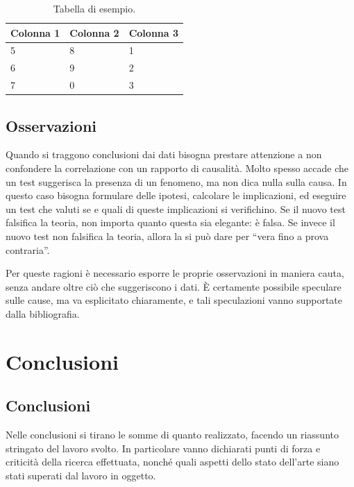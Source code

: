 \documentclass[12pt,italian]{report}
\begin{document}
\begin{table}
	\centering
    \begin{tabular}{|l|l|l|}
	\hline
	Colonna 1 & Colonna 2 & Colonna 3 \\ \hline
	5         & 8         & 1         \\
	6         & 9         & 2         \\
	7         & 0         & 3         \\ \hline
\end{tabular}
	\caption{Tabella di esempio.}
	\label{tab:sample}
\end{table}

\section{Osservazioni}

Quando si traggono conclusioni dai dati bisogna prestare attenzione a non confondere la correlazione con un rapporto di causalità. Molto spesso accade che un test suggerisca la presenza di un fenomeno, ma non dica nulla sulla causa. In questo caso bisogna formulare delle ipotesi, calcolare le implicazioni, ed eseguire un test che valuti se e quali di queste implicazioni si verifichino. Se il nuovo test falsifica la teoria, non importa quanto questa sia elegante: è falsa. Se invece il nuovo test non falsifica la teoria, allora la si può dare per ``vera fino a prova contraria''.

Per queste ragioni è necessario esporre le proprie osservazioni in maniera cauta, senza andare oltre ciò che suggeriscono i dati. \`E certamente possibile speculare sulle cause, ma va esplicitato chiaramente, e tali speculazioni vanno supportate dalla bibliografia.

% 
% 

\chapter{Conclusioni}
\label{cap6}

\section{Conclusioni}

Nelle conclusioni si tirano le somme di quanto realizzato, facendo un riassunto stringato del lavoro svolto. In particolare vanno dichiarati punti di forza e criticità della ricerca effettuata, nonché quali aspetti dello stato dell'arte siano stati superati dal lavoro in oggetto.
\end{document}
